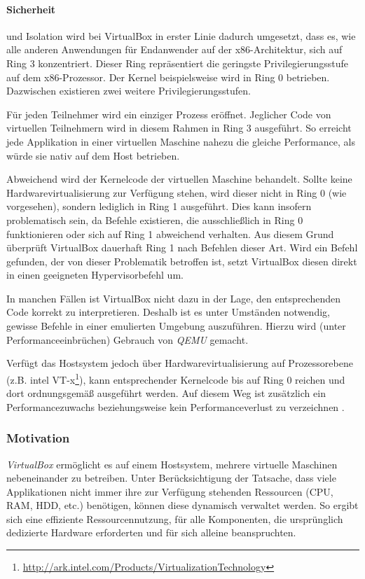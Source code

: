 \paragraph{Sicherheit} und Isolation wird bei VirtualBox in erster Linie dadurch umgesetzt, dass
es, wie alle anderen Anwendungen für Endanwender auf der x86-Architektur, sich auf Ring 3 konzentriert.
Dieser Ring repräsentiert die geringste Privilegierungsstufe auf dem x86-Prozessor. Der Kernel
beispielsweise wird in Ring 0 betrieben. Dazwischen existieren zwei weitere Privilegierungsstufen.

Für jeden Teilnehmer wird ein einziger Prozess eröffnet. Jeglicher Code von virtuellen Teilnehmern
wird in diesem Rahmen in Ring 3 ausgeführt. So erreicht jede Applikation in einer virtuellen Maschine
nahezu die gleiche Performance, als würde sie nativ auf dem Host betrieben.

Abweichend wird der Kernelcode der virtuellen Maschine behandelt. Sollte keine Hardwarevirtualisierung
zur Verfügung stehen, wird dieser nicht in Ring 0 (wie vorgesehen), sondern lediglich in Ring 1
ausgeführt. Dies kann insofern problematisch sein, da Befehle existieren, die ausschließlich
in Ring 0 funktionieren oder sich auf Ring 1 abweichend verhalten. Aus diesem Grund überprüft
VirtualBox dauerhaft Ring 1 nach Befehlen dieser Art. Wird ein Befehl gefunden, der von dieser
Problematik betroffen ist, setzt VirtualBox diesen direkt in einen geeigneten Hypervisorbefehl
um.

In manchen Fällen ist VirtualBox nicht dazu in der Lage, den entsprechenden Code korrekt zu
interpretieren. Deshalb ist es unter Umständen notwendig, gewisse Befehle in einer
emulierten Umgebung auszuführen. Hierzu wird (unter Performanceeinbrüchen) Gebrauch von
\textit{QEMU} gemacht. 

Verfügt das Hostsystem jedoch über Hardwarevirtualisierung auf Prozessorebene 
(z.B. intel VT-x\footnote{\url{http://ark.intel.com/Products/VirtualizationTechnology}}),
kann entsprechender Kernelcode bis auf Ring 0 reichen und dort ordnungsgemäß ausgeführt werden.
Auf diesem Weg ist zusätzlich
ein Performancezuwachs beziehungsweise kein Performanceverlust zu verzeichnen \cite{victor10}.

\subsubsection[Motivation (Schenkel)]{Motivation}
\textit{VirtualBox} ermöglicht es auf einem Hostsystem, mehrere virtuelle Maschinen nebeneinander
zu betreiben. Unter Berücksichtigung der Tatsache, dass viele Applikationen nicht immer ihre
zur Verfügung stehenden Ressourcen (CPU, RAM, HDD, etc.) benötigen, können diese dynamisch verwaltet
werden. So ergibt sich eine effiziente Ressourcennutzung, für alle Komponenten, die ursprünglich
dedizierte Hardware erforderten und für sich alleine beanspruchten.

